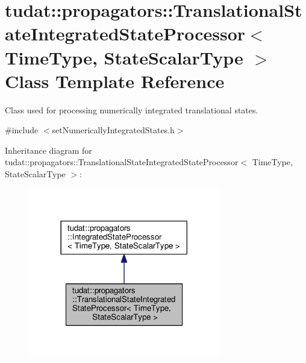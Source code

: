 \hypertarget{classtudat_1_1propagators_1_1TranslationalStateIntegratedStateProcessor}{}\section{tudat\+:\+:propagators\+:\+:Translational\+State\+Integrated\+State\+Processor$<$ Time\+Type, State\+Scalar\+Type $>$ Class Template Reference}
\label{classtudat_1_1propagators_1_1TranslationalStateIntegratedStateProcessor}


Class used for processing numerically integrated translational states.  




{\ttfamily \#include $<$set\+Numerically\+Integrated\+States.\+h$>$}



Inheritance diagram for tudat\+:\+:propagators\+:\+:Translational\+State\+Integrated\+State\+Processor$<$ Time\+Type, State\+Scalar\+Type $>$\+:
\nopagebreak
\begin{figure}[H]
\begin{center}
\leavevmode
\includegraphics[width=237pt]{classtudat_1_1propagators_1_1TranslationalStateIntegratedStateProcessor__inherit__graph}
\end{center}
\end{figure}



